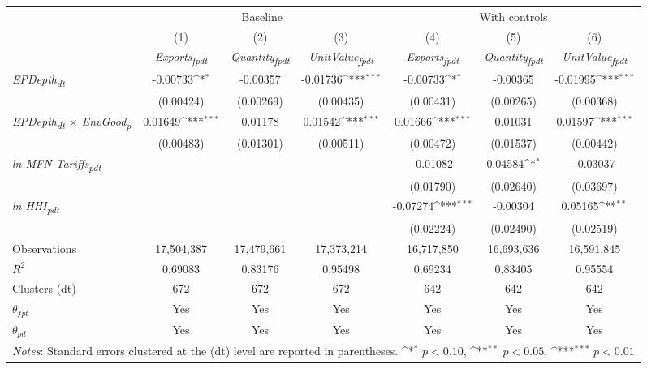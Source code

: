 {
\def\sym#1{\ifmmode^{#1}\else\(^{#1}\)\fi}
\begin{tabular}{l*{6}{c}}
\toprule
&\multicolumn{3}{c}{Baseline}&\multicolumn{3}{c}{With controls}\\\cmidrule(lr){2-4}\cmidrule(lr){5-7}
&(1)&(2)&(3)&(4)&(5)&(6)\\
&\textit{Exports\textsubscript{fpdt}}&\textit{Quantity\textsubscript{fpdt}}&\textit{UnitValue\textsubscript{fpdt}}&\textit{Exports\textsubscript{fpdt}}&\textit{Quantity\textsubscript{fpdt}}&\textit{UnitValue\textsubscript{fpdt}}\\
\midrule
\textit{EPDepth\textsubscript{dt}} & -0.00733\sym{*} & -0.00357 & -0.01736\sym{***} & -0.00733\sym{*} & -0.00365 & -0.01995\sym{***}\\
 & (0.00424) & (0.00269) & (0.00435) & (0.00431) & (0.00265) & (0.00368)\\
\addlinespace
\textit{EPDepth\textsubscript{dt} $\times$ EnvGood\textsubscript{p}} & 0.01649\sym{***} & 0.01178 & 0.01542\sym{***} & 0.01666\sym{***} & 0.01031 & 0.01597\sym{***}\\
 & (0.00483) & (0.01301) & (0.00511) & (0.00472) & (0.01537) & (0.00442)\\
\addlinespace
\textit{ln MFN Tariffs\textsubscript{pdt}} &  &  &  & -0.01082 & 0.04584\sym{*} & -0.03037\\
 &  &  &  & (0.01790) & (0.02640) & (0.03697)\\
\addlinespace
\textit{ln HHI\textsubscript{pdt}} &  &  &  & -0.07274\sym{***} & -0.00304 & 0.05165\sym{**}\\
 &  &  &  & (0.02224) & (0.02490) & (0.02519)\\
\midrule
Observations & 17,504,387 & 17,479,661 & 17,373,214 & 16,717,850 & 16,693,636 & 16,591,845\\
$R^{2}$ & 0.69083 & 0.83176 & 0.95498 & 0.69234 & 0.83405 & 0.95554\\
Clusters (dt) & 672 & 672 & 672 & 642 & 642 & 642\\
$\theta_{fpt}$ & Yes & Yes & Yes & Yes & Yes & Yes\\
$\theta_{pd}$ & Yes & Yes & Yes & Yes & Yes & Yes\\
\bottomrule
\multicolumn{7}{l}{\footnotesize \textit{Notes}: Standard errors clustered at the (dt) level are reported in parentheses. \sym{*} \(p<0.10\), \sym{**} \(p<0.05\), \sym{***} \(p<0.01\)}\\
\end{tabular}
}

